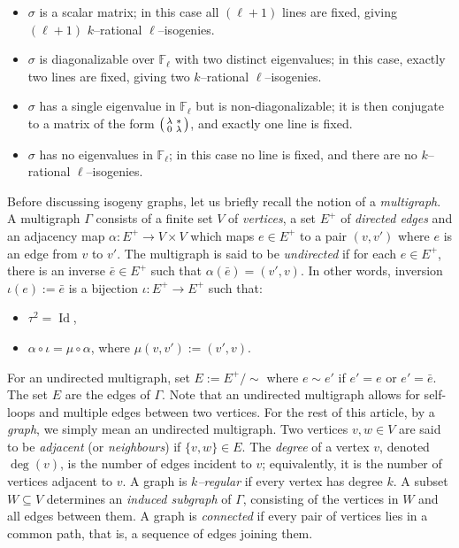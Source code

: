 \documentclass[table]{amsart}
\newcommand{\F}{\mathbb{F}}
\newcommand{\op}[1]{\operatorname{#1}}
\numberwithin{equation}{section}
\begin{document}
\begin{itemize}
    \item $\sigma$ is a scalar matrix; in this case all $(\ell+1)$ lines are fixed, giving $(\ell+1)$ $k$–rational $\ell$–isogenies.
    \item $\sigma$ is diagonalizable over $\F_\ell$ with two distinct eigenvalues; in this case, exactly two lines are fixed, giving two $k$–rational $\ell$–isogenies.
    \item $\sigma$ has a single eigenvalue in $\F_\ell$ but is non-diagonalizable; it is then conjugate to a matrix of the form $\begin{psmallmatrix}\lambda & * \\ 0 & \lambda\end{psmallmatrix}$, and exactly one line is fixed.
    \item $\sigma$ has no eigenvalues in $\F_\ell$; in this case no line is fixed, and there are no $k$–rational $\ell$–isogenies.
\end{itemize}
\par Before discussing isogeny graphs, let us briefly recall the notion of a \emph{multigraph}. A multigraph $\Gamma$ consists of a finite set $V$ of \emph{vertices}, a set $E^+$ of \emph{directed edges} and an adjacency map $\alpha: E^+\rightarrow V\times V$ which maps $e\in E^+$ to a pair $(v, v')$ where $e$ is an edge from $v$ to $v'$. The multigraph is said to be \emph{undirected} if for each $e\in E^+$, there is an inverse $\bar{e}\in E^+$ such that $\alpha(\bar{e})=(v',v)$. In other words, inversion $\iota(e):=\bar{e}$ is a bijection $\iota: E^+\rightarrow E^+$ such that:
\begin{itemize}
    \item $\tau^2=\op{Id}$,
    \item $\alpha\circ \iota=\mu\circ \alpha$, where $\mu(v,v'):=(v',v)$.
\end{itemize} For an undirected multigraph, set $E:=E^+/\sim$ where $e\sim e'$ if $e'=e$ or $e'=\bar{e}$. The set $E$ are the edges of $\Gamma$. Note that an undirected multigraph allows for self-loops and multiple edges between two vertices. For the rest of this article, by a \emph{graph}, we simply mean an undirected multigraph. Two vertices $v,w \in V$ are said to be \emph{adjacent} (or \emph{neighbours}) if $\{v,w\}\in E$. The \emph{degree} of a vertex $v$, denoted $\deg(v)$, is the number of edges incident to $v$; equivalently, it is the number of vertices adjacent to $v$. A graph is \emph{$k$–regular} if every vertex has degree $k$. A subset $W \subseteq V$ determines an \emph{induced subgraph} of $\Gamma$, consisting of the vertices in $W$ and all edges between them. A graph is \emph{connected} if every pair of vertices lies in a common path, that is, a sequence of edges joining them.
\end{document}
